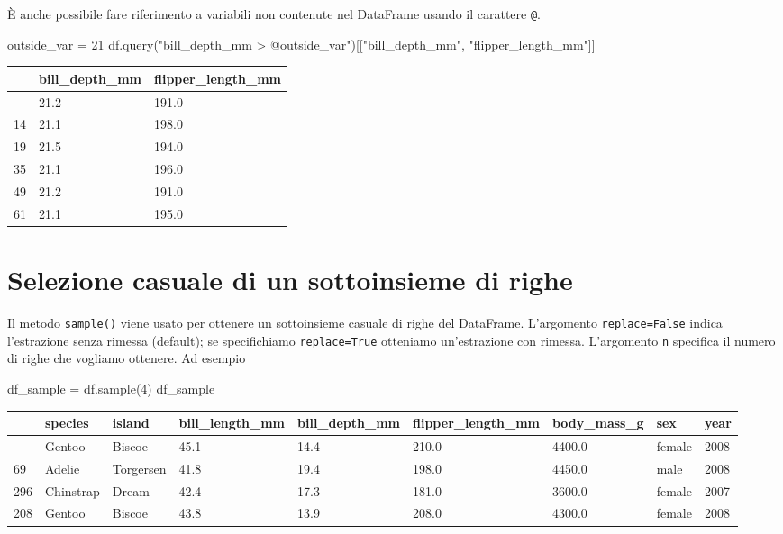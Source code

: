 \documentclass[
  letterpaper,
  krantz2]{{[}./krantz{]}}
\newenvironment{Shaded}{\begin{snugshade}}{\end{snugshade}}
\newcommand{\DecValTok}[1]{\textcolor[rgb]{0.68,0.00,0.00}{#1}}
\newcommand{\NormalTok}[1]{\textcolor[rgb]{0.00,0.23,0.31}{#1}}
\newcommand{\OperatorTok}[1]{\textcolor[rgb]{0.37,0.37,0.37}{#1}}
\newcommand{\StringTok}[1]{\textcolor[rgb]{0.13,0.47,0.30}{#1}}
\begin{document}
È anche possibile fare riferimento a variabili non contenute nel
DataFrame usando il carattere \texttt{@}.

\begin{Shaded}
\begin{Highlighting}[]
\NormalTok{outside\_var }\OperatorTok{=} \DecValTok{21}
\NormalTok{df.query(}\StringTok{"bill\_depth\_mm \textgreater{} @outside\_var"}\NormalTok{)[[}\StringTok{"bill\_depth\_mm"}\NormalTok{, }\StringTok{"flipper\_length\_mm"}\NormalTok{]]}
\end{Highlighting}
\end{Shaded}

\begin{longtable}[]{@{}lll@{}}
\toprule\noalign{}
& bill\_depth\_mm & flipper\_length\_mm \\
\midrule\noalign{}
\endhead
\bottomrule\noalign{}
\endlastfoot
13 & 21.2 & 191.0 \\
14 & 21.1 & 198.0 \\
19 & 21.5 & 194.0 \\
35 & 21.1 & 196.0 \\
49 & 21.2 & 191.0 \\
61 & 21.1 & 195.0 \\
\end{longtable}

\section{Selezione casuale di un sottoinsieme di
righe}\label{selezione-casuale-di-un-sottoinsieme-di-righe}

Il metodo \texttt{sample()} viene usato per ottenere un sottoinsieme
casuale di righe del DataFrame. L'argomento \texttt{replace=False}
indica l'estrazione senza rimessa (default); se specifichiamo
\texttt{replace=True} otteniamo un'estrazione con rimessa. L'argomento
\texttt{n} specifica il numero di righe che vogliamo ottenere. Ad
esempio

\begin{Shaded}
\begin{Highlighting}[]
\NormalTok{df\_sample }\OperatorTok{=}\NormalTok{ df.sample(}\DecValTok{4}\NormalTok{)}
\NormalTok{df\_sample}
\end{Highlighting}
\end{Shaded}

\begin{longtable}[]{@{}lllllllll@{}}
\toprule\noalign{}
& species & island & bill\_length\_mm & bill\_depth\_mm &
flipper\_length\_mm & body\_mass\_g & sex & year \\
\midrule\noalign{}
\endhead
\bottomrule\noalign{}
\endlastfoot
204 & Gentoo & Biscoe & 45.1 & 14.4 & 210.0 & 4400.0 & female & 2008 \\
69 & Adelie & Torgersen & 41.8 & 19.4 & 198.0 & 4450.0 & male & 2008 \\
296 & Chinstrap & Dream & 42.4 & 17.3 & 181.0 & 3600.0 & female &
2007 \\
208 & Gentoo & Biscoe & 43.8 & 13.9 & 208.0 & 4300.0 & female & 2008 \\
\end{longtable}
\end{document}
